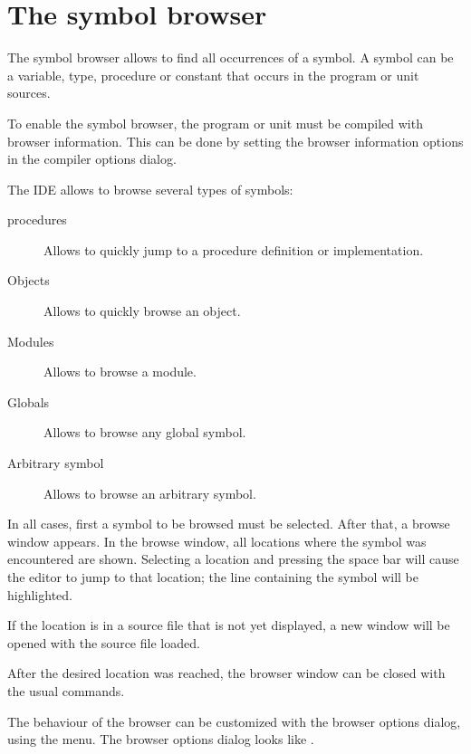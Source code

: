 \section{The symbol browser}
\label{se:browser}
The symbol browser allows to find all occurrences of a symbol. A symbol
can be a variable, type, procedure or constant that occurs in the
program or unit sources.

To enable the symbol browser, the program or unit must be compiled with
browser information. This can be done by setting the browser information
options in the compiler options dialog.

The IDE allows to browse several types of symbols:
\begin{description}
\item[procedures] Allows to quickly jump to a procedure definition or
implementation.
\item[Objects] Allows to quickly browse an object.
\item[Modules] Allows to browse a module.
\item[Globals] Allows to browse any global symbol.
\item[Arbitrary symbol] Allows to browse an arbitrary symbol.
\end{description}
In all cases, first a symbol to be browsed must be selected. After that,
a browse window appears. In the browse window, all locations where the
symbol was encountered are shown. Selecting a location and pressing the
space bar will cause the editor to jump to that location; the line
containing the symbol will be highlighted.

If the location is in a source file that is not yet displayed, a new
window will be opened with the source file loaded.

After the desired location was reached, the browser window can be closed
with the usual commands.

The behaviour of the browser can be customized with the browser options
dialog, using the  menu.
The browser options dialog looks like .


